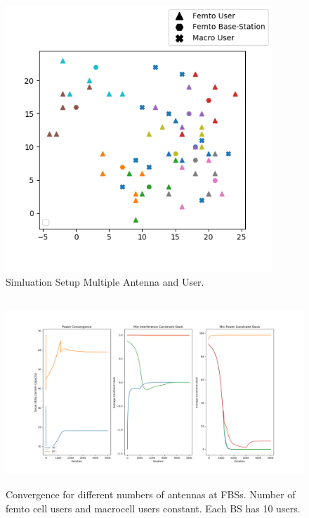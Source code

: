 \documentclass[12pt,a4paper]{report}
\begin{document}
\begin{figure}[H]
	\includegraphics[width=\textwidth,height = 10cm]{figures/system_figure_multiple}
	  \caption{Simluation Setup Multiple Antenna and User.
	  }
\end{figure}


\begin{figure}[H]
	  	\includegraphics[width=\textwidth,height = 7cm]{figures/increasing_antenna}
	  		  \caption{Convergence for different numbers of antennas at FBSs. Number of femto cell users and macrocell users constant. Each BS has 10 users.}
	  \label{fig:}
\end{figure}

%
\end{document}
